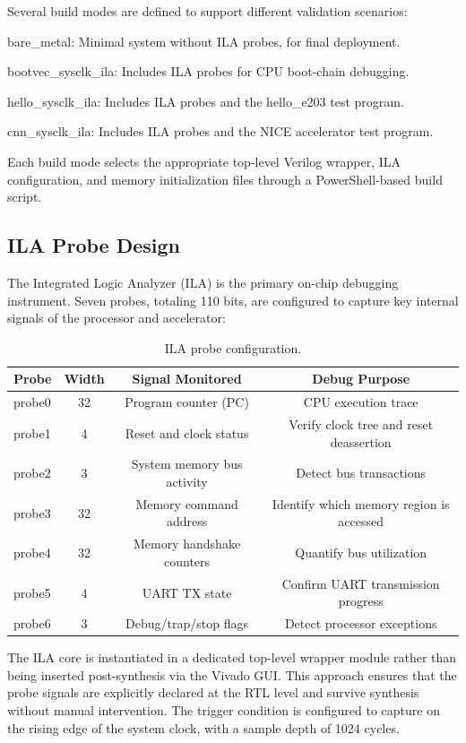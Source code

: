 Several build modes are defined to support different validation scenarios:

bare\_metal: Minimal system without ILA probes, for final deployment.

bootvec\_sysclk\_ila: Includes ILA probes for CPU boot-chain debugging.

hello\_sysclk\_ila: Includes ILA probes and the hello\_e203 test program.

cnn\_sysclk\_ila: Includes ILA probes and the NICE accelerator test program.

Each build mode selects the appropriate top-level Verilog wrapper, ILA configuration, and memory initialization files through a PowerShell-based build script.

\subsection{ILA Probe Design}

The Integrated Logic Analyzer (ILA) is the primary on-chip debugging instrument. Seven probes, totaling 110 bits, are configured to capture key internal signals of the processor and accelerator:

\begin{table}[htbp]
\centering
\caption{ILA probe configuration.}
\label{tab:3_6}
\begin{tabular}{lccc}
\hline
Probe & Width & Signal Monitored & Debug Purpose \\ \hline\hline
probe0 & 32 & Program counter (PC) & CPU execution trace \\ \hline
probe1 & 4 & Reset and clock status & Verify clock tree and reset deassertion \\ \hline
probe2 & 3 & System memory bus activity & Detect bus transactions \\ \hline
probe3 & 32 & Memory command address & Identify which memory region is accessed \\ \hline
probe4 & 32 & Memory handshake counters & Quantify bus utilization \\ \hline
probe5 & 4 & UART TX state & Confirm UART transmission progress \\ \hline
probe6 & 3 & Debug/trap/stop flags & Detect processor exceptions \\ \hline
\end{tabular}
\end{table}

The ILA core is instantiated in a dedicated top-level wrapper module rather than being inserted post-synthesis via the Vivado GUI. This approach ensures that the probe signals are explicitly declared at the RTL level and survive synthesis without manual intervention. The trigger condition is configured to capture on the rising edge of the system clock, with a sample depth of 1024 cycles.

